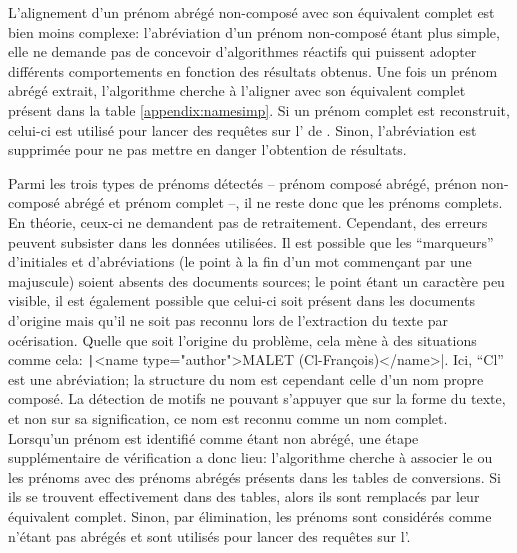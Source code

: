 L'alignement d'un prénom abrégé non-composé avec son équivalent complet est bien moins complexe: l'abréviation d'un prénom non-composé étant plus simple, elle ne demande pas de concevoir d'algorithmes réactifs qui puissent adopter différents comportements en fonction des résultats obtenus. Une fois un prénom abrégé extrait, l'algorithme cherche à l'aligner avec son équivalent complet présent dans la table \ref{appendix:namesimp}. Si un prénom complet est reconstruit, celui-ci est utilisé pour lancer des requêtes sur l'\api{} de \wkd{}. Sinon, l'abréviation est supprimée pour ne pas mettre en danger l'obtention de résultats.

Parmi les trois types de prénoms détectés -- prénom composé abrégé, prénon non-composé abrégé et prénom complet --, il ne reste donc que les prénoms complets. En théorie, ceux-ci ne demandent pas de retraitement. Cependant, des erreurs peuvent subsister dans les données utilisées. Il est possible que les \enquote{marqueurs} d'initiales et d'abréviations (le point à la fin d'un mot commençant par une majuscule) soient absents des documents sources; le point étant un caractère peu visible, il est également possible que celui-ci soit présent dans les documents d'origine mais qu'il ne soit pas reconnu lors de l'extraction du texte par océrisation. Quelle que soit l'origine du problème, cela mène à des situations comme cela: \texttt|<name type="author">MALET (Cl-François)</name>|. Ici, \enquote{Cl} est une abréviation; la structure du nom est cependant celle d'un nom propre composé. La détection de motifs ne pouvant s'appuyer que sur la forme du texte, et non sur sa signification, ce nom est reconnu comme un nom complet. Lorsqu'un prénom est identifié comme étant non abrégé, une étape supplémentaire de vérification a donc lieu: l'algorithme cherche à associer le ou les prénoms avec des prénoms abrégés présents dans les tables de conversions. Si ils se trouvent effectivement dans des tables, alors ils sont remplacés par leur équivalent complet. Sinon, par élimination, les prénoms sont considérés comme n'étant pas abrégés et sont utilisés pour lancer des requêtes sur l'\api{}.

